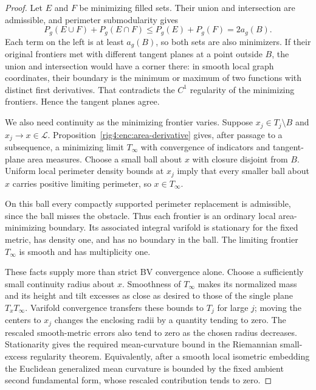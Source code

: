 \begin{proof}
Let $E$ and $F$ be minimizing filled sets. Their union and intersection
are admissible, and perimeter submodularity gives
\[
 P_g(E\cup F)+P_g(E\cap F)
 \le P_g(E)+P_g(F)=2a_g(B).
\]
Each term on the left is at least $a_g(B)$, so both sets are also
minimizers. If their original frontiers met with different tangent
planes at a point outside $B$, the union and intersection would have
a corner there: in smooth local graph coordinates, their boundary is
the minimum or maximum of two functions with distinct first
derivatives. That contradicts the $C^1$ regularity of the minimizing
frontiers. Hence the tangent planes agree.

We also need continuity as the minimizing frontier varies. Suppose
$x_j\in T_j\setminus B$ and $x_j\to x\in\mathcal L$.
Proposition~\ref{rig4:enc:area-derivative} gives, after passage to a
subsequence, a minimizing limit $T_\infty$ with convergence of
indicators and tangent-plane area measures. Choose a small ball about
$x$ with closure disjoint from $B$. Uniform local perimeter density
bounds at $x_j$ imply that every smaller ball about $x$ carries
positive limiting perimeter, so $x\in T_\infty$.

On this ball every compactly supported perimeter replacement is
admissible, since the ball misses the obstacle. Thus each frontier is
an ordinary local area-minimizing boundary. Its associated integral
varifold is stationary for the fixed metric, has density one, and has
no boundary in the ball. The limiting frontier $T_\infty$ is smooth
and has multiplicity one.

These facts supply more than strict BV convergence alone. Choose a
sufficiently small continuity radius about $x$. Smoothness of
$T_\infty$ makes its normalized mass and its height and tilt excesses
as close as desired to those of the single plane $T_xT_\infty$.
Varifold convergence transfers these bounds to $T_j$ for large $j$;
moving the centers to $x_j$ changes the enclosing radii by a quantity
tending to zero. The rescaled smooth-metric errors also tend to zero
as the chosen radius decreases. Stationarity gives the required
mean-curvature bound in the Riemannian small-excess regularity theorem.
Equivalently, after a smooth local isometric embedding the Euclidean
generalized mean curvature is bounded by the fixed ambient second
fundamental form, whose rescaled contribution tends to zero.


\end{proof}
